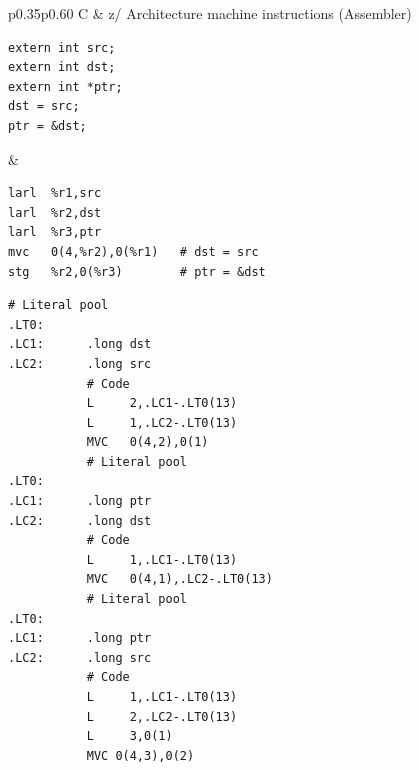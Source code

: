 \documentclass[USenglish,fontsize=11pt,twoside,%
  toc=bib,toc=idx,toc=graduated,numbers=noendperiod,
  bookmarks=true,
  bookmarksnumbered=true,
  bookmarksopen=true,
  bookmarksopenlevel=1,
  breaklinks=true,
  colorlinks=true,
  linkcolor=black,
  pdfpagelayout={TwoPageRight},
  pdfusetitle=true
]{scrreprt}
\newcommand{\ARCH}{z/\kern-1pt Ar\-chi\-tec\-ture}
\newcommand{\ARCH}{ESA/390}
\newenvironment{DIFnomarkup}{}{} %
\begin{document}
\begin{table}
  \centering
  \begin{DIFnomarkup}
  \begin{tabular}{p{}p{}}
    \toprule
    C & \ARCH{} machine instructions (Assembler) \\
    \midrule
\begin{lstlisting}[style=short]
extern int src;
extern int dst;
extern int *ptr;
dst = src;
ptr = &dst;
\end{lstlisting}
    &
\ifzseries
\begin{lstlisting}[style=short,language=simpleasm]
larl  %r1,src
larl  %r2,dst
larl  %r3,ptr
mvc   0(4,%r2),0(%r1)   # dst = src
stg   %r2,0(%r3)        # ptr = &dst
\end{lstlisting}
\else
\begin{lstlisting}[style=short,language=simpleasm]
           # Literal pool
.LT0:
.LC1:      .long dst
.LC2:      .long src
           # Code
           L     2,.LC1-.LT0(13)
           L     1,.LC2-.LT0(13)
           MVC   0(4,2),0(1)
           # Literal pool
.LT0:
.LC1:      .long ptr
.LC2:      .long dst
           # Code
           L     1,.LC1-.LT0(13)
           MVC   0(4,1),.LC2-.LT0(13)
           # Literal pool
.LT0:
.LC1:      .long ptr
.LC2:      .long src
           # Code
           L     1,.LC1-.LT0(13)
           L     2,.LC2-.LT0(13)
           L     3,0(1)
           MVC 0(4,3),0(2)
\end{lstlisting}
\fi \\
    \bottomrule
  \end{tabular}
  \end{DIFnomarkup}
  \caption{Absolute addressing}
  \label{tab:addresses}
\end{table}
\end{document}
